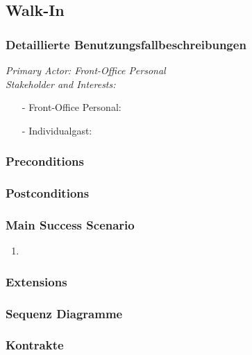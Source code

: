\documentclass[./detailed_overview_usecases.tex]{subfiles}
\begin{document}
    \subsection{Walk-In}
    \subsubsection{Detaillierte Benutzungsfallbeschreibungen}

    \textit{Primary Actor: Front-Office Personal}
    \\
    \textit{Stakeholder and Interests:}
    \begin{itemize}
        \item[-] Front-Office Personal:
        \item[-] Individualgast:
    \end{itemize}

    \subsubsection*{Preconditions}


    \subsubsection*{Postconditions}


    \subsubsection*{Main Success Scenario}
    \begin{enumerate}
        \item
    \end{enumerate}

    \subsubsection*{Extensions}


    \subsubsection{Sequenz Diagramme}
    \subsubsection{Kontrakte}
\end{document}
